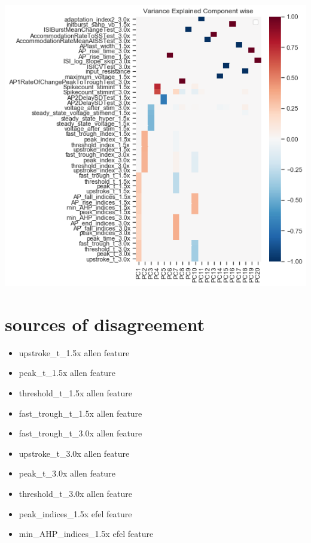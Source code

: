 \begin{center}

\includegraphics[width=0.7\linewidth]{figures/cortical_model_data_agreement_54_1.png}
\end{center}

\section{sources of disagreement}
\begin{itemize}
    \item upstroke\_t\_1.5x allen feature
    \item  peak\_t\_1.5x allen feature
    \item threshold\_t\_1.5x allen feature
    \item fast\_trough\_t\_1.5x allen feature
    \item fast\_trough\_t\_3.0x allen feature
    \item upstroke\_t\_3.0x allen feature
    \item peak\_t\_3.0x allen feature
    \item threshold\_t\_3.0x allen feature
    \item peak\_indices\_1.5x efel feature
    \item min\_AHP\_indices\_1.5x efel feature
\end{itemize}



